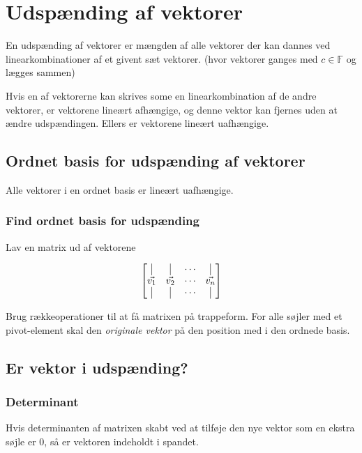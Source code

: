 \section{Udspænding af vektorer}
En udspænding af vektorer er mængden af alle vektorer der kan dannes ved linearkombinationer af et givent sæt vektorer. (hvor vektorer ganges med $c \in \mathbb{F}$ og lægges sammen)

Hvis en af vektorerne kan skrives some en linearkombination af de andre vektorer, er vektorene lineært afhængige, og denne vektor kan fjernes uden at ændre udspændingen. Ellers er vektorene lineært uafhængige.

\subsection{Ordnet basis for udspænding af vektorer}
Alle vektorer i en ordnet basis er lineært uafhængige. 

\label{sec:ordnet-basis-udspaending}
\subsubsection{Find ordnet basis for udspænding}
Lav en matrix ud af vektorene

\[
    \begin{bmatrix}
        \vline & \vline & \cdots & \vline \\
        \vec{v_1} & \vec{v_2} & \cdots &  \vec{v_n} \\
        \vline & \vline & \cdots & \vline \\

    \end{bmatrix}
\]

Brug rækkeoperationer til at få matrixen på trappeform. 
For alle søjler med et pivot-element skal den \emph{originale vektor} på den position med i den ordnede basis.


\subsection{Er vektor i udspænding?}
\label{sec:span}

\subsubsection{Determinant}
Hvis determinanten af matrixen skabt ved at tilføje den nye vektor som en ekstra søjle er 0, så er vektoren indeholdt i spandet.


